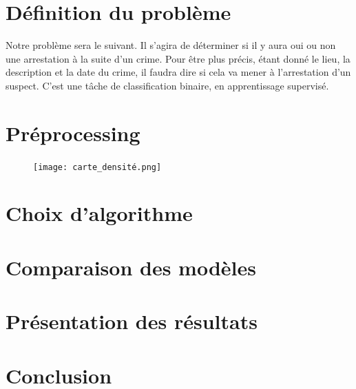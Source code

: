 \documentclass{article}
\begin{document}
    \section{Définition du problème}
    Notre problème sera le suivant. Il s'agira de déterminer si il y aura
    oui ou non une arrestation à la suite d'un crime. 
    Pour être plus précis, étant donné le lieu, la description et la date du crime, 
    il faudra dire si cela va mener à l'arrestation d'un suspect.
    C'est une tâche de classification
    binaire, en apprentissage supervisé.

    \section{Préprocessing}
    \begin{figure}[H]
            \centering
	    \texttt{[image: carte\_densité.png]}
    \end{figure}

    \section{Choix d'algorithme}

    \section{Comparaison des modèles}

    \section{Présentation des résultats}

    \section{Conclusion}
\end{document}
